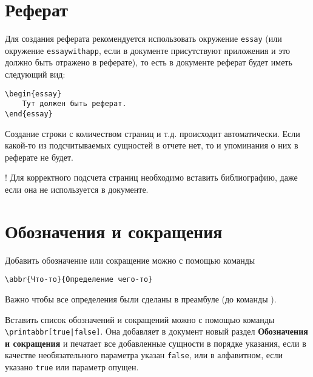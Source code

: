 \section{Реферат}

Для создания реферата рекомендуется использовать окружение \lstinline:essay:
(или окружение \lstinline:essaywithapp:, если в документе присутствуют
приложения и это должно быть отражено в реферате), то есть в документе реферат
будет иметь следующий вид: 

\newpage

\lstinline$\begin{essay}$\\
\lstinline$    Тут должен быть реферат.$\\
\lstinline$\end{essay}$

Создание строки с количеством страниц и т.д. происходит автоматически. Если
какой-то из подсчитываемых сущностей в отчете нет, то и упоминания о них в
реферате не будет.

! Для корректного подсчета страниц необходимо вставить библиографию, даже если
она не используется в документе.

\section{Обозначения и сокращения}

Добавить обозначение или сокращение можно с помощью команды

\lstinline:\abbr{Что-то}{Определение чего-то}: 

Важно чтобы все определения были сделаны в преамбуле (до команды
\lstinline::). 

Вставить список обозначений и сокращений можно с помощью
команды \lstinline:\printabbr[true|false]:. Она добавляет в документ новый раздел
\textbf{Обозначения и сокращения} и печатает все добавленные сущности в
порядке указания, если в качестве необязательного параметра указан
\lstinline:false:, или в алфавитном, если указано \lstinline:true: или параметр
опущен. 